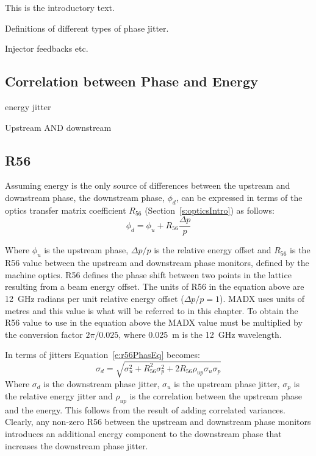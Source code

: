 
This is the introductory text.


Definitions of different types of phase jitter.



Injector feedbacks etc.


\subsection{Correlation between Phase and Energy}
\label{ss:corrPhaseEnergy}

energy jitter

Upstream AND downstream


\subsection{R56}
\label{ss:r56Equations}

Assuming energy is the only source of differences between the upstream and downstream phase, the downstream phase, \(\phi_d\), can be expressed in terms of the optics transfer matrix coefficient \(R_{56}\) (Section~\ref{s:opticsIntro}) as follows:
\begin{equation}
\phi_d = \phi_u + R_{56}\frac{\Delta p}{p}
\label{e:r56PhasEq}
\end{equation}

Where \(\phi_u\) is the upstream phase, \(\Delta p / p\) is the relative energy offset and \(R_{56}\) is the R56 value between the upstream and downstream phase monitors, defined by the machine optics. R56 defines the phase shift between two points in the lattice resulting from a beam energy offset. The units of R56 in the equation above are 12~GHz radians per unit relative energy offset (\(\Delta p/p = 1\)). MADX uses units of metres and this value is what will be referred to in this chapter. To obtain the R56 value to use in the equation above the MADX value must be multiplied by the conversion factor \(2\pi/0.025\), where 0.025~m is the 12~GHz wavelength.

In terms of jitters Equation~\ref{e:r56PhasEq} becomes:
\begin{equation}
\sigma_d = \sqrt{\sigma_u^2 + R_{56}^2\sigma_{p}^2 + 2R_{56}\rho_{up}\sigma_{u}\sigma_{p}}
\label{e:r56JitEq}
\end{equation}
Where \(\sigma_d\) is the downstream phase jitter, \(\sigma_u\) is the upstream phase jitter, \(\sigma_p\) is the relative energy jitter and \(\rho_{up}\) is the correlation between the upstream phase and the energy. This follows from the result of adding correlated variances. Clearly, any non-zero R56 between the upstream and downstream phase monitors introduces an additional energy component to the downstream phase that increases the downstream phase jitter.


